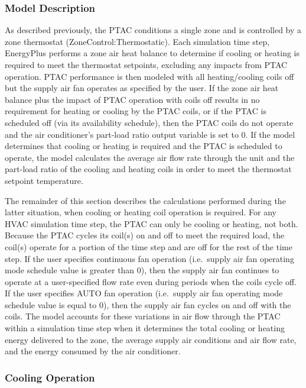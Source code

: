 \subsubsection{Model Description}\label{model-description-017}

As described previously, the PTAC conditions a single zone and is controlled by a zone thermostat (ZoneControl:Thermostatic). Each simulation time step, EnergyPlus performs a zone air heat balance to determine if cooling or heating is required to meet the thermostat setpoints, excluding any impacts from PTAC operation. PTAC performance is then modeled with all heating/cooling coils off but the supply air fan operates as specified by the user. If the zone air heat balance plus the impact of PTAC operation with coils off results in no requirement for heating or cooling by the PTAC coils, or if the PTAC is scheduled off (via its availability schedule), then the PTAC coils do not operate and the air conditioner's part-load ratio output variable is set to 0. If the model determines that cooling or heating is required and the PTAC is scheduled to operate, the model calculates the average air flow rate through the unit and the part-load ratio of the cooling and heating coils in order to meet the thermostat setpoint temperature.

The remainder of this section describes the calculations performed during the latter situation, when cooling or heating coil operation is required. For any HVAC simulation time step, the PTAC can only be cooling or heating, not both. Because the PTAC cycles its coil(s) on and off to meet the required load, the coil(s) operate for a portion of the time step and are off for the rest of the time step. If the user specifies continuous fan operation (i.e.~supply air fan operating mode schedule value is greater than 0), then the supply air fan continues to operate at a user-specified flow rate even during periods when the coils cycle off. If the user specifies AUTO fan operation (i.e.~supply air fan operating mode schedule value is equal to 0), then the supply air fan cycles on and off with the coils. The model accounts for these variations in air flow through the PTAC within a simulation time step when it determines the total cooling or heating energy delivered to the zone, the average supply air conditions and air flow rate, and the energy consumed by the air conditioner.

\subsubsection{Cooling Operation}\label{cooling-operation-001}

